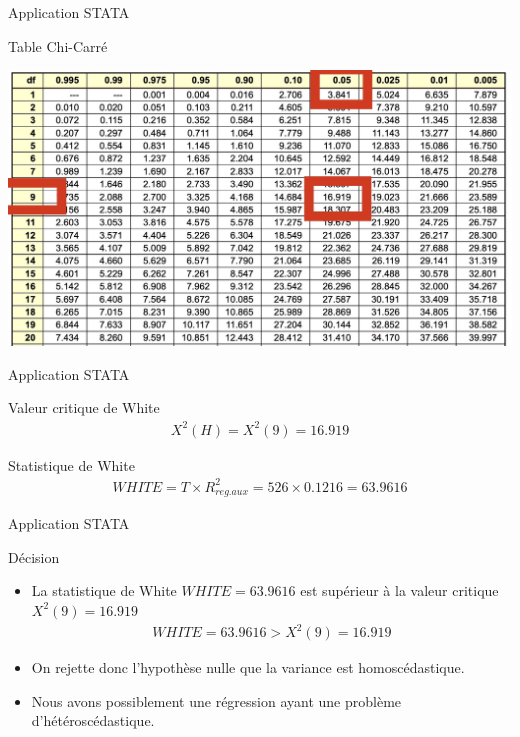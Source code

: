 \documentclass{beamer}
\begin{document}
\begin{frame}{Application STATA}
\begin{block}{Table Chi-Carré}
\begin{center}
\includegraphics[scale=.17]{chitable.png}
\end{center}
\end{block}
\end{frame}


\begin{frame}{Application STATA}
\begin{block}{Valeur critique de White}
\begin{align*}
X^2(H)=X^2(9)=16.919
\end{align*}
\end{block}
\begin{block}{Statistique de White}
\begin{align*}
WHITE = T \times R_{reg.aux}^2=526 \times 0.1216 = 63.9616
\end{align*}
\end{block}

\end{frame}

\begin{frame}{Application STATA}
\begin{block}{Décision}
\begin{itemize}
\item La statistique de White $WHITE = 63.9616$ est supérieur à la valeur critique $X^2(9)=16.919$
\begin{align*}
WHITE = 63.9616 > X^2(9)=16.919
\end{align*}
\item On rejette donc l'hypothèse nulle que la variance est homoscédastique.
\item Nous avons possiblement une régression ayant une problème d'hétéroscédastique.
\end{itemize}
\end{block}
\end{frame}
\end{document}
